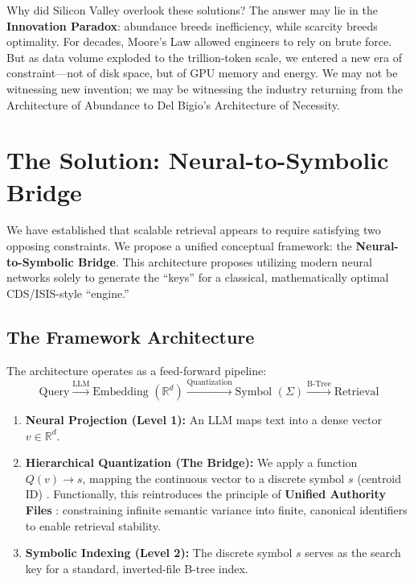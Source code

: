 \documentclass[manuscript,screen,nonacm]{acmart}
\begin{document}
Why did Silicon Valley overlook these solutions? The answer may lie in the \textbf{Innovation Paradox}: abundance breeds inefficiency, while scarcity breeds optimality. For decades, Moore's Law allowed engineers to rely on brute force. But as data volume exploded to the trillion-token scale, we entered a new era of constraint---not of disk space, but of GPU memory and energy. We may not be witnessing new invention; we may be witnessing the industry returning from the Architecture of Abundance to Del Bigio's Architecture of Necessity.

\section{The Solution: Neural-to-Symbolic Bridge}

We have established that scalable retrieval appears to require satisfying two opposing constraints. We propose a unified conceptual framework: the \textbf{Neural-to-Symbolic Bridge}. This architecture proposes utilizing modern neural networks solely to generate the ``keys'' for a classical, mathematically optimal CDS/ISIS-style ``engine.''

\subsection{The Framework Architecture}

The architecture operates as a feed-forward pipeline:
\[ \text{Query} \xrightarrow{\text{LLM}} \text{Embedding } (\mathbb{R}^d) \xrightarrow{\text{Quantization}} \text{Symbol } (\Sigma) \xrightarrow{\text{B-Tree}} \text{Retrieval} \]

\begin{enumerate}
    \item \textbf{Neural Projection (Level 1):} An LLM maps text into a dense vector $v \in \mathbb{R}^d$.
    \item \textbf{Hierarchical Quantization (The Bridge):} We apply a function $Q(v) \rightarrow s$, mapping the continuous vector to a discrete symbol $s$ (centroid ID) \cite{zandieh2025}. Functionally, this reintroduces the principle of \textbf{Unified Authority Files} \cite{caprazli2003}: constraining infinite semantic variance into finite, canonical identifiers to enable retrieval stability.
    \item \textbf{Symbolic Indexing (Level 2):} The discrete symbol $s$ serves as the search key for a standard, inverted-file B-tree index.
\end{enumerate}
\end{document}
